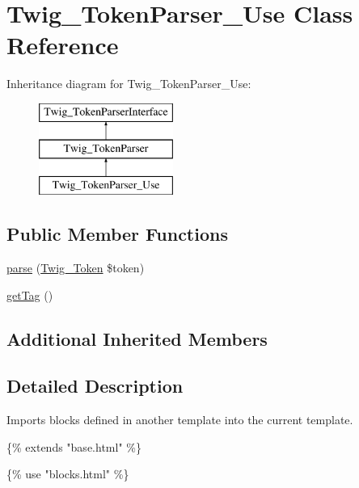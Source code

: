 \hypertarget{classTwig__TokenParser__Use}{}\section{Twig\+\_\+\+Token\+Parser\+\_\+\+Use Class Reference}
\label{classTwig__TokenParser__Use}
Inheritance diagram for Twig\+\_\+\+Token\+Parser\+\_\+\+Use\+:\begin{figure}[H]
\begin{center}
\leavevmode
\includegraphics[height=3.000000cm]{classTwig__TokenParser__Use}
\end{center}
\end{figure}
\subsection*{Public Member Functions}
\begin{DoxyCompactItemize}
\item 
\hyperlink{classTwig__TokenParser__Use_aa37ee155e94623ae96541afe93d4943b}{parse} (\hyperlink{classTwig__Token}{Twig\+\_\+\+Token} \$token)
\item 
\hyperlink{classTwig__TokenParser__Use_a41240e7c50c2723dfbf55070b528ea9f}{get\+Tag} ()
\end{DoxyCompactItemize}
\subsection*{Additional Inherited Members}


\subsection{Detailed Description}
Imports blocks defined in another template into the current template.


\begin{DoxyPre}
\{\% extends "base.html" \%\}\end{DoxyPre}



\begin{DoxyPre}\{\% use "blocks.html" \%\}\end{DoxyPre}



